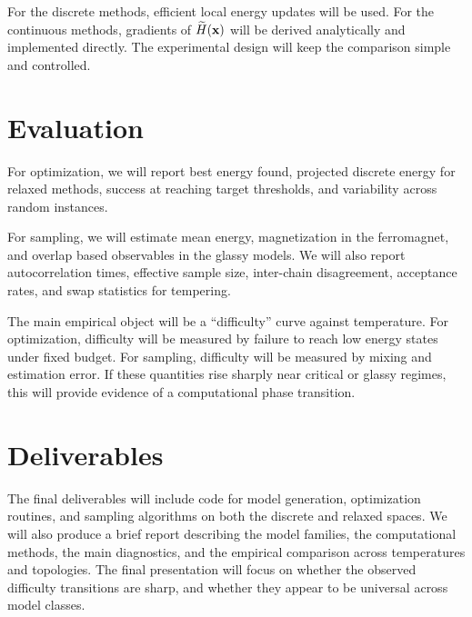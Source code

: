 \documentclass{article}
\begin{document}
For the discrete methods, efficient local energy updates will be used. For the continuous methods, gradients of $\widetilde H(\vb{x})$ will be derived analytically and implemented directly. The experimental design will keep the comparison simple and controlled.

\section{Evaluation}

For optimization, we will report best energy found, projected discrete energy for relaxed methods, success at reaching target thresholds, and variability across random instances.

For sampling, we will estimate mean energy, magnetization in the ferromagnet, and overlap based observables in the glassy models. We will also report autocorrelation times, effective sample size, inter-chain disagreement, acceptance rates, and swap statistics for tempering.

The main empirical object will be a ``difficulty'' curve against temperature. For optimization, difficulty will be measured by failure to reach low energy states under fixed budget. For sampling, difficulty will be measured by mixing and estimation error. If these quantities rise sharply near critical or glassy regimes, this will provide evidence of a computational phase transition.

\section{Deliverables}

The final deliverables will include code for model generation, optimization routines, and sampling algorithms on both the discrete and relaxed spaces. We will also produce a brief report describing the model families, the computational methods, the main diagnostics, and the empirical comparison across temperatures and topologies. The final presentation will focus on whether the observed difficulty transitions are sharp, and whether they appear to be universal across model classes.
\end{document}
